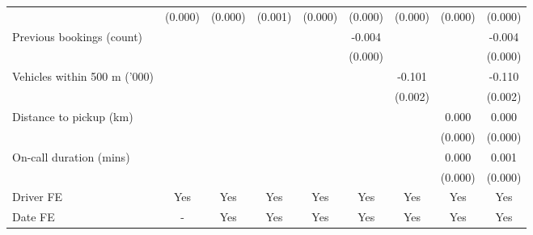 \documentclass[reviewmode]{restud}
\begin{document}
\begin{landscape}
\begin{table}
{\begin{tabular}{l*{8}{S}}
			                    &     (0.000)         &     (0.000)         &     (0.001)         &     (0.000)         &     (0.000)         &     (0.000)         &     (0.000)         &     (0.000)         \\
			\addlinespace
			Previous bookings (count)&                     &                     &                     &                     &      -0.004&                     &                     &      -0.004\\
			                    &                     &                     &                     &                     &     (0.000)         &                     &                     &     (0.000)         \\
			\addlinespace
			Vehicles within 500 m ('000)&                     &                     &                     &                     &                     &      -0.101&                     &      -0.110\\
			                    &                     &                     &                     &                     &                     &     (0.002)         &                     &     (0.002)         \\
			\addlinespace
			Distance to pickup (km)&                     &                     &                     &                     &                     &                     &       0.000         &       0.000         \\
			                    &                     &                     &                     &                     &                     &                     &     (0.000)         &     (0.000)         \\
			\addlinespace
			On-call duration (mins)&                     &                     &                     &                     &                     &                     &       0.000&       0.001\\
			                    &                     &                     &                     &                     &                     &                     &     (0.000)         &     (0.000)         \\
			\addlinespace
			Driver FE           &       {Yes}         &       {Yes}         &       {Yes}         &       {Yes}         &       {Yes}         &       {Yes}         &       {Yes}         &       {Yes}         \\
			\addlinespace
			Date FE           &       {-}         &       {Yes}         &       {Yes}         &       {Yes}         &       {Yes}         &       {Yes}         &       {Yes}         &       {Yes}         \\

\end{tabular}}
\end{table}
\end{landscape}
\end{document}
